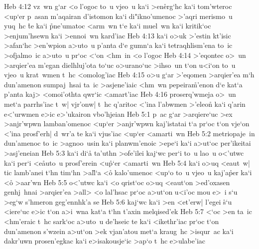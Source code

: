 \vs Heb 4:12
vz~wn
g`ar
<o
l'ogoc
to~u
vjeo~u
ka`i
>en\r{e}rg`hc
ka`i
tom'wteroc
<up`er
p~asan
m'aqairan
d'istomon
ka`i
di"ikno'umenoc
>'aqri
merismo~u
yuq~hc
\r{t}e
ka`i
\r{p}ne'umatoc
<arm~wn
t`e
ka`i
muel~wn
ka`i
kritik`oc
>enjum'hsewn
ka`i
>ennoi~wn
kard'iac\bibvsend
\vs Heb 4:13
ka`i
o>uk
>'estin
kt'isic
>afan`hc
>en'wpion
a>uto~u
p'anta
d`e
gumn`a
ka`i
tetraqhlism'ena
to~ic
>ofjalmo~ic
a>uto~u
pr`oc
<`on
<hm~in
<o
l'ogoc\bibvsend
\vs Heb 4:14
>'eqontec
o>~un
>arqier'ea
m'egan
dielhluj'ota
to`uc
o>urano`uc
>ihso~un
t`on
u<i`on
to~u
vjeo~u
krat~wmen
t~hc
<omolog'iac\bibvsend
\vs Heb 4:15
o>u
g`ar
>'eqomen
>arqier'ea
m`h
dun'amenon
sumpaj~hsai
ta~ic
>asjene'iaic
<hm~wn
pepeira\r{m}'enon
d`e
kat`a
p'anta
kaj>
<omoi'othta
qwr`ic
<amart'iac\bibvsend
\vs Heb 4:16
proserq'wmeja
o>~un
met`a
parrhs'iac
t~w|
vjr'onw|
t~hc
q'aritoc
<'ina
l'abwmen
>'eleo\r{n}
ka`i
q'arin
e<'urwmen
e>ic
e>'ukairon
vbo'hjeian\bibvsend
\vs Heb 5:1
p~ac
g`ar
>arqiere`uc
>ex
>anjr'wpwn
lamban'omenoc
<up`er
>anjr'wpwn
kaj'istatai
t`a
pr`oc
t`on
vje`on
<'ina
prosf'erh|
d~wr'a
te
ka`i
vjus'iac
<up`er
<amarti~wn\bibvsend
\vs Heb 5:2
metriopaje~in
dun'amenoc
to~ic
>agnoo~usin
ka`i
planwm'enoic
>epe`i
ka`i
a>ut`oc
per'ikeitai
>asj'eneian\bibvsend
\vs Heb 5:3
ka`i
di`a\r{}
ta'uthn
>ofe'ilei
kaj`wc
per`i
to~u
lao~u
o<'utwc
ka`i
per`i
<e\r{a}uto~u
prosf'erein
<u\r{p}`er
<amarti~wn\bibvsend
\vs Heb 5:4
ka`i
o>uq
<eaut~w|
tic
lamb'anei
t`hn
tim`hn
>al\r{l}`a
<o\r{}
kalo'umenoc
<up`o
to~u
vjeo~u
kaj'a\r{p}er
ka`i
<o\r{}
>aar'wn\bibvsend
\vs Heb 5:5
o<'utwc
ka`i
<o
qrist`oc
o>uq
<eaut`on
>ed'oxasen
genhj~hnai
>arqier'ea
>all>
<o
lal'hsac
pr`oc
a>ut`on
u<i'oc
mou
e>~i
s`u
>eg`w
s'hmeron
geg'ennhk'a
se\bibvsend
\vs Heb 5:6
kaj`wc
ka`i
>en
<et'erw|
l'egei
\r{s}`u
<iere`uc
e>ic
t`on
a>i~wna
kat`a
t`hn
t'axin
melqised'ek\bibvsend
\vs Heb 5:7
<`oc
>en
ta~ic
<hm'eraic
t~hc
sark`oc
a>uto~u
de'hseic
te
ka`i
<ikethr'iac
pr`oc
t`on
dun'amenon
s'wzein
a>ut`on
>ek
vjan'atou
met`a
kraug~hc
>isqur~ac
ka`i
dakr'uwn
prosen'egkac
ka`i
e>isakousje`ic
>ap`o
t~hc
e>ulabe'iac\bibvsend
